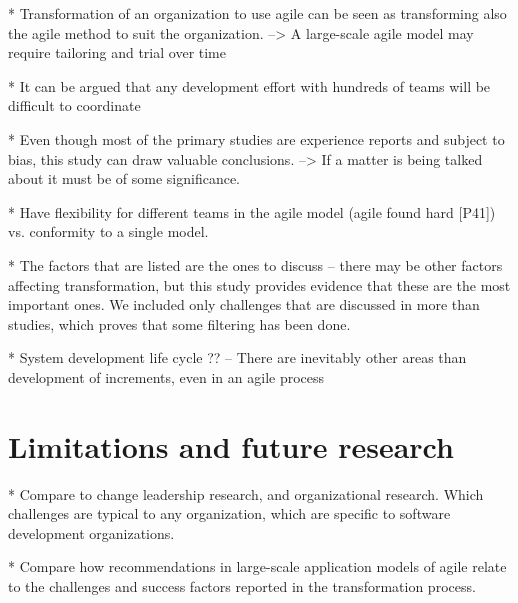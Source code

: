 \documentclass[preprint,authoryear,12pt]{elsarticle}
\begin{document}
* Transformation of an organization to use agile can be seen as transforming
  also the agile method to suit the organization.
  --> A large-scale agile model may require tailoring and trial over time

* It can be argued that any development effort with hundreds of teams will be
  difficult to coordinate

* Even though most of the primary studies are experience reports and subject to
  bias, this study can draw valuable conclusions. --> If a matter is being
  talked about it must be of some significance.

* Have flexibility for different teams in the agile model (agile found
  hard [P41]) vs. conformity to a single model. 

* The factors that are listed are the ones to discuss -- there may be other
  factors affecting transformation, but this study provides evidence that these
  are the most important ones. We included only challenges that are discussed in
  more than studies, which proves that some filtering has been done.

* System development life cycle ?? -- There are inevitably other areas than
  development of increments, even in an agile process

\section{Limitations and future research}
\label{sec:conclusion}

* Compare to change leadership research, and organizational research. Which
  challenges are typical to any organization, which are specific to software
  development organizations.

* Compare how recommendations in large-scale application models of agile relate
  to the challenges and success factors reported in the transformation process. 






\end{document}
